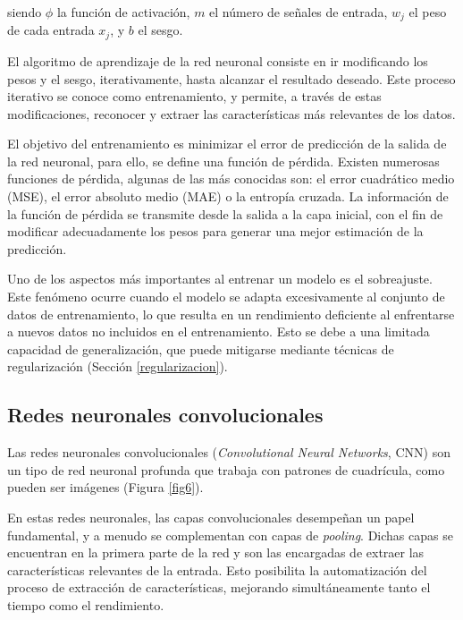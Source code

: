 siendo $\phi$ la función de activación, $m$ el número de señales de entrada, $w_j$ el peso de cada entrada $x_j$, y $b$ el sesgo.

El algoritmo de aprendizaje de la red neuronal consiste en ir modificando los pesos y el sesgo, iterativamente, hasta alcanzar el resultado deseado. Este proceso iterativo se conoce como entrenamiento, y permite, a través de estas modificaciones, reconocer y extraer las características más relevantes de los datos.

El objetivo del entrenamiento es minimizar el error de predicción de la salida de la red neuronal, para ello, se define una función de pérdida. Existen numerosas funciones de pérdida, algunas de las más conocidas son: el error cuadrático medio (MSE), el error absoluto medio (MAE) o la entropía cruzada. La información de la función de pérdida se transmite desde la salida a la capa inicial, con el fin de modificar adecuadamente los pesos para generar una mejor estimación de la predicción.

Uno de los aspectos más importantes al entrenar un modelo es el sobreajuste. Este fenómeno ocurre cuando el modelo se adapta excesivamente al conjunto de datos de entrenamiento, lo que resulta en un rendimiento deficiente al enfrentarse a nuevos datos no incluidos en el entrenamiento. Esto se debe a una limitada capacidad de generalización, que puede mitigarse mediante técnicas de regularización (Sección \ref{regularizacion}).


\subsection{Redes neuronales convolucionales}
Las redes neuronales convolucionales (\textit{Convolutional Neural Networks}, CNN) \cite{35, 36, 37} son un tipo de red neuronal profunda que trabaja con patrones de cuadrícula, como pueden ser imágenes (Figura \ref{fig6}).

En estas redes neuronales, las capas convolucionales desempeñan un papel fundamental, y a menudo se complementan con capas de \textit{pooling}. Dichas capas se encuentran en la primera parte de la red y son las encargadas de extraer las características relevantes de la entrada. Esto posibilita la automatización del proceso de extracción de características, mejorando simultáneamente tanto el tiempo como el rendimiento.

